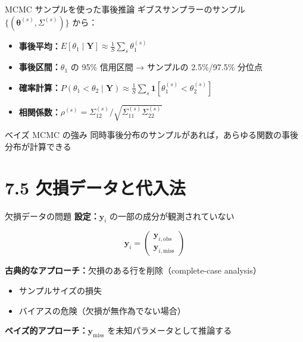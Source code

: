 \documentclass[lualatex,aspectratio=169,12pt]{beamer}
\begin{document}
\begin{frame}{MCMC サンプルを使った事後推論}
  ギブスサンプラーのサンプル $\{(\bm{\theta}^{(s)}, \Sigma^{(s)})\}$ から：

  \bigskip
  \begin{itemize}
    \item \textbf{事後平均：}$E[\theta_1\mid\bm{Y}] \approx \frac{1}{S}\sum_s\theta_1^{(s)}$
    \item \textbf{事後区間：}$\theta_1$ の 95\% 信用区間 → サンプルの 2.5\%/97.5\% 分位点
    \item \textbf{確率計算：}$P(\theta_1 < \theta_2 \mid \bm{Y}) \approx \frac{1}{S}\sum_s \mathbf{1}[\theta_1^{(s)} < \theta_2^{(s)}]$
    \item \textbf{相関係数：}$\rho^{(s)} = \Sigma_{12}^{(s)}/\sqrt{\Sigma_{11}^{(s)}\Sigma_{22}^{(s)}}$
  \end{itemize}

  \bigskip
  \begin{block}{ベイズ MCMC の強み}
    同時事後分布のサンプルがあれば，あらゆる関数の事後分布が計算できる
  \end{block}
\end{frame}

\section{7.5 欠損データと代入法}

\begin{frame}{欠損データの問題}
  \textbf{設定：}$\bm{y}_i$ の一部の成分が観測されていない

  \[
    \bm{y}_i = \begin{pmatrix}\bm{y}_{i,\text{obs}}\\\bm{y}_{i,\text{miss}}\end{pmatrix}
  \]

  \bigskip
  \textbf{古典的なアプローチ：}欠損のある行を削除（complete-case analysis）
  \begin{itemize}
    \item サンプルサイズの損失
    \item バイアスの危険（欠損が無作為でない場合）
  \end{itemize}

  \bigskip
  \textbf{ベイズ的アプローチ：}$\bm{y}_{\text{miss}}$ を\alert{未知パラメータ}として推論する
\end{frame}
\end{document}
